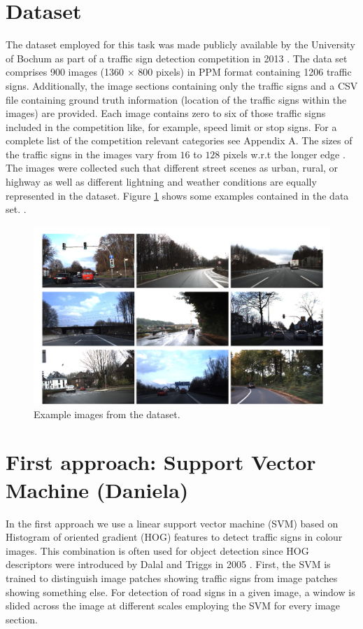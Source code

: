 \documentclass[12pt,a4paper,bibliography=totocnumbered,listof=totocnumbered]{scrartcl}
\begin{document}
\section{Dataset}
The dataset employed for this task was made publicly available by the University of Bochum as part of a traffic sign detection competition in 2013 \cite{dataset}. The data set comprises 900 images (1360 $\times$ 800 pixels) in PPM format containing 1206 traffic signs. Additionally, the image sections containing only the traffic signs and a CSV file containing ground truth information (location of the traffic signs within the images) are provided. Each image contains zero to six of those traffic signs included in the competition like, for example, speed limit or stop signs. For a complete list of the competition relevant categories see Appendix A. The sizes of the traffic signs in the images vary from $16$ to $128$ pixels w.r.t the longer edge \cite{Houben-IJCNN-2013}. \\
The images were collected such that different street scenes as urban, rural, or highway as well as different lightning and weather conditions  are equally represented in the dataset. Figure \ref{fig:ex_images} shows some examples contained in the data set. \cite{Houben-IJCNN-2013}.
\begin{figure}[H]
  \centering
  \includegraphics[width=\textwidth]{ex_imgs_smaller.png}
  \caption{Example images from the dataset.}
  \label{fig:ex_images}
\end{figure}

\section{First approach: Support Vector Machine \small{(Daniela)}} 
In the first approach we use a linear support vector machine (SVM) based on Histogram of oriented gradient (HOG) features to detect traffic signs in colour images. This combination is often used for object detection since HOG descriptors were introduced by Dalal and Triggs in 2005 \cite{Dalaltriggs}.
First, the SVM is trained to distinguish image patches showing traffic signs from image patches showing something else. For detection of road signs in a given image, a window is slided across the image at different scales employing the SVM for every image section. 
\end{document}
